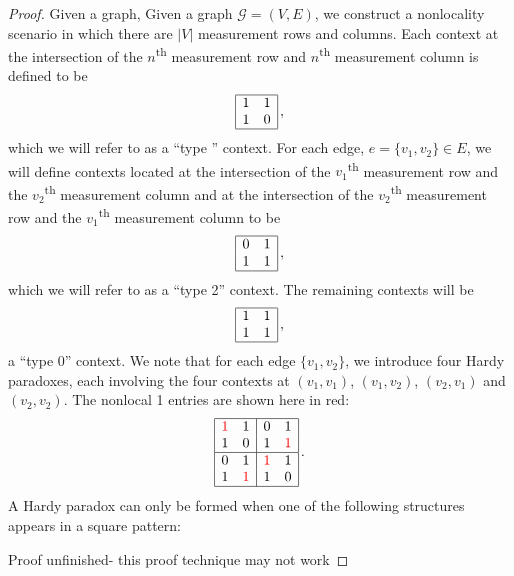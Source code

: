 \documentclass{amsart}
\theoremstyle{definition}
\begin{document}
\begin{proof}
Given a graph, 
Given a graph $\mathcal{G}=(V,E)$, we construct a nonlocality scenario in which there are $\left|V\right|$ measurement rows and columns. Each context at the intersection of the $n$\textsuperscript{th} measurement row and $n$\textsuperscript{th} measurement column is defined to be
\begin{equation}
\begin{array}{| c c |} 
\hline
 1& 1\\ 
 1 & 0\\ \hline
\end{array}\,,
\end{equation}
which we will refer to as a ``type '' context.
For each edge, $e=\{v_1,v_2\}\in E$, we will define contexts located at the intersection of the $v_1$\textsuperscript{th} measurement row and the $v_2$\textsuperscript{th} measurement column and at the intersection of the $v_2$\textsuperscript{th} measurement row and the $v_1$\textsuperscript{th} measurement column to be
\begin{equation}
\begin{array}{| c c |} 
\hline
 0& 1\\ 
 1 & 1\\ \hline
\end{array}\,,
\end{equation}
which we will refer to as a ``type 2'' context. The remaining contexts will be 
\begin{equation}
\begin{array}{| c c |} 
\hline
 1& 1\\ 
 1 & 1\\ \hline
\end{array}\,,
\end{equation}
a ``type 0'' context. We note that for each edge $\{v_1,v_2\}$, we introduce four Hardy paradoxes, each involving the four contexts at $(v_1,v_1)$, $(v_1,v_2)$, $(v_2,v_1)$ and $(v_2,v_2)$. The nonlocal 1 entries are shown here in red:
\begin{equation}
\begin{array}{| c c |c c|} 
\hline
 \textcolor{red}{1}& 1&0&1\\ 
 1 & 0&1& \textcolor{red}{1}\\ \hline
 0& 1& \textcolor{red}{1}&1\\ 
 1 & \textcolor{red}{1}&1&0\\ \hline
\end{array}\,.
\end{equation}
A Hardy paradox can only be formed when one of the following structures appears in a square pattern:


Proof unfinished- this proof technique may not work


\end{proof}
\end{document}
